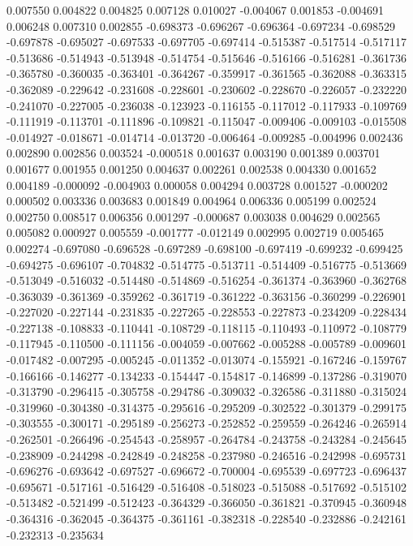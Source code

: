 0.007550
0.004822
0.004825
0.007128
0.010027
-0.004067
0.001853
-0.004691
0.006248
0.007310
0.002855
-0.698373
-0.696267
-0.696364
-0.697234
-0.698529
-0.697878
-0.695027
-0.697533
-0.697705
-0.697414
-0.515387
-0.517514
-0.517117
-0.513686
-0.514943
-0.513948
-0.514754
-0.515646
-0.516166
-0.516281
-0.361736
-0.365780
-0.360035
-0.363401
-0.364267
-0.359917
-0.361565
-0.362088
-0.363315
-0.362089
-0.229642
-0.231608
-0.228601
-0.230602
-0.228670
-0.226057
-0.232220
-0.241070
-0.227005
-0.236038
-0.123923
-0.116155
-0.117012
-0.117933
-0.109769
-0.111919
-0.113701
-0.111896
-0.109821
-0.115047
-0.009406
-0.009103
-0.015508
-0.014927
-0.018671
-0.014714
-0.013720
-0.006464
-0.009285
-0.004996
0.002436
0.002890
0.002856
0.003524
-0.000518
0.001637
0.003190
0.001389
0.003701
0.001677
0.001955
0.001250
0.004637
0.002261
0.002538
0.004330
0.001652
0.004189
-0.000092
-0.004903
0.000058
0.004294
0.003728
0.001527
-0.000202
0.000502
0.003336
0.003683
0.001849
0.004964
0.006336
0.005199
0.002524
0.002750
0.008517
0.006356
0.001297
-0.000687
0.003038
0.004629
0.002565
0.005082
0.000927
0.005559
-0.001777
-0.012149
0.002995
0.002719
0.005465
0.002274
-0.697080
-0.696528
-0.697289
-0.698100
-0.697419
-0.699232
-0.699425
-0.694275
-0.696107
-0.704832
-0.514775
-0.513711
-0.514409
-0.516775
-0.513669
-0.513049
-0.516032
-0.514480
-0.514869
-0.516254
-0.361374
-0.363960
-0.362768
-0.363039
-0.361369
-0.359262
-0.361719
-0.361222
-0.363156
-0.360299
-0.226901
-0.227020
-0.227144
-0.231835
-0.227265
-0.228553
-0.227873
-0.234209
-0.228434
-0.227138
-0.108833
-0.110441
-0.108729
-0.118115
-0.110493
-0.110972
-0.108779
-0.117945
-0.110500
-0.111156
-0.004059
-0.007662
-0.005288
-0.005789
-0.009601
-0.017482
-0.007295
-0.005245
-0.011352
-0.013074
-0.155921
-0.167246
-0.159767
-0.166166
-0.146277
-0.134233
-0.154447
-0.154817
-0.146899
-0.137286
-0.319070
-0.313790
-0.296415
-0.305758
-0.294786
-0.309032
-0.326586
-0.311880
-0.315024
-0.319960
-0.304380
-0.314375
-0.295616
-0.295209
-0.302522
-0.301379
-0.299175
-0.303555
-0.300171
-0.295189
-0.256273
-0.252852
-0.259559
-0.264246
-0.265914
-0.262501
-0.266496
-0.254543
-0.258957
-0.264784
-0.243758
-0.243284
-0.245645
-0.238909
-0.244298
-0.242849
-0.248258
-0.237980
-0.246516
-0.242998
-0.695731
-0.696276
-0.693642
-0.697527
-0.696672
-0.700004
-0.695539
-0.697723
-0.696437
-0.695671
-0.517161
-0.516429
-0.516408
-0.518023
-0.515088
-0.517692
-0.515102
-0.513482
-0.521499
-0.512423
-0.364329
-0.366050
-0.361821
-0.370945
-0.360948
-0.364316
-0.362045
-0.364375
-0.361161
-0.382318
-0.228540
-0.232886
-0.242161
-0.232313
-0.235634
